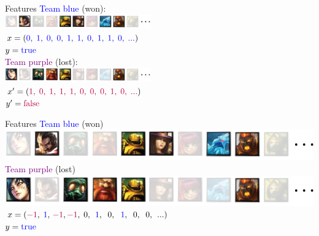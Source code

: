 \begin{frame}{Features}
\centering
\textcolor{blue}{Team blue} (won):\\
\hspace{20pt}\includegraphics[width=0.47\textwidth]{img/kent/pickblue.png}\\
\vspace{8pt}
$x = (\textcolor{blue}{0,\;1,\;0,\;0,\;1,\;1,\;0,\;1,\;1,\;0,\;...})$\\
$y = \textcolor{blue}{\text{true}}$\\
\vspace{40pt}
\textcolor{purple}{Team purple} (lost):\\
\hspace{20pt}\includegraphics[width=0.47\textwidth]{img/kent/pickpurple.png}\\
\vspace{8pt}
$x' = (\textcolor{purple}{1,\;0,\;1,\;1,\;1,\;0,\;0,\;0,\;1,\;0,\;...})$\\
$y' = \textcolor{purple}{\text{false}}$
\end{frame}

\begin{frame}{Features}
\centering
\textcolor{blue}{Team blue} (won)\\
\hspace{20pt}\includegraphics[scale=0.31]{img/kent/pickblue.png}\\
\vspace{20pt}
\textcolor{purple}{Team purple} (lost)\\
\hspace{20pt}\includegraphics[scale=0.31]{img/kent/pickpurple.png}\\
\vspace{20pt}
$x = (\textcolor{purple}{-1},\;\textcolor{blue}{1},\,\textcolor{purple}{-1},\textcolor{purple}{-1},\;0,\;\,\textcolor{blue}{1},\;\;0,\;\,\,\textcolor{blue}{1},\;\;0,\;\;0,\;\,...)$\\
$y = \textcolor{blue}{\text{true}}$\\
\end{frame}

